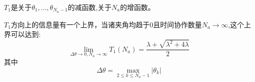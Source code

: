 \begin{frame}
$T_1$是关于$\theta_1,\dots,\theta_{N_a-1}$的减函数,关于$N_a$的增函数。

$T_1$方向上的信息量有一个上界，当诸夹角均趋于0且时间协作数量$N_a\to \infty$,这个上界可以达到:
\begin{equation*}
\lim_{\Delta \theta\to 0,N_a\to \infty}T_1(N_a)=\frac{\lambda+\sqrt{\lambda^2+4\lambda}}{2}
\end{equation*}
其中
\[
\Delta \theta=\max_{2\leq k \leq N_a-1}|\theta_k|
\]

\end{frame}



